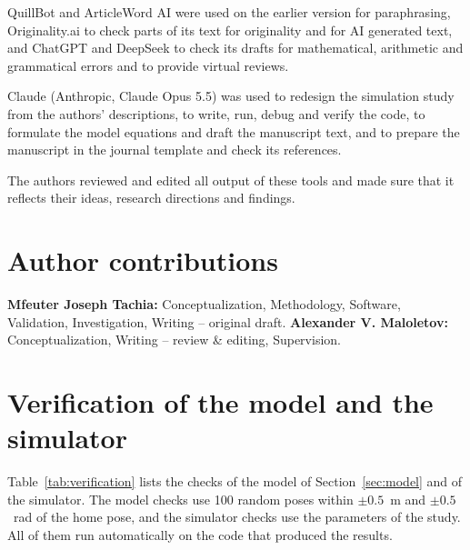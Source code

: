 \documentclass{interact}
\newif\ifblind
\begin{document}
QuillBot and ArticleWord AI were used on the earlier version for paraphrasing, Originality.ai to check parts of its text for originality and for AI generated text, and ChatGPT and DeepSeek to check its drafts for mathematical, arithmetic and grammatical errors and to provide virtual reviews.

Claude (Anthropic, Claude Opus 5.5) was used to redesign the simulation study from the authors' descriptions, to write, run, debug and verify the code, to formulate the model equations and draft the manuscript text, and to prepare the manuscript in the journal template and check its references.

The authors reviewed and edited all output of these tools and made sure that it reflects their ideas, research directions and findings.

\ifblind\else
\section*{Author contributions}
\textbf{Mfeuter Joseph Tachia:} Conceptualization, Methodology, Software, Validation, Investigation, Writing -- original draft. \textbf{Alexander V. Maloletov:} Conceptualization, Writing -- review \& editing, Supervision.
\fi




\appendix
\section{Verification of the model and the simulator}\label{app:verification}

Table~\ref{tab:verification} lists the checks of the model of Section~\ref{sec:model} and of the simulator. The model checks use 100 random poses within $\pm0.5$~m and $\pm0.5$~rad of the home pose, and the simulator checks use the parameters of the study. All of them run automatically on the code that produced the results.
\end{document}
